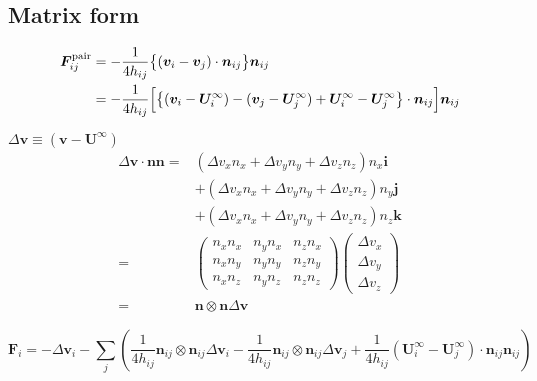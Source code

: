 \documentclass[12pt]{article}
\begin{document}
\newpage
\subsection*{Matrix form}
\begin{align}
 \bm{F}_{ij}^{\mathrm{pair}}
&= 
- \frac{1}{4 h_{ij}}
\bigl\{
(\bm{v}_i-
\bm{v}_j)\cdot
\bm{n}_{ij}
\bigr\}\bm{n}_{ij} \\
&=
- \frac{1}{4 h_{ij}}
\Bigl[
\bigl\{
(\bm{v}_i- \bm{U}^{\infty}_i)-
(\bm{v}_j- \bm{U}^{\infty}_j)
+ \bm{U}^{\infty}_i 
- \bm{U}^{\infty}_j
\bigr\}\cdot
\bm{n}_{ij}
\Bigr]
\bm{n}_{ij}
\end{align}

$\Delta \bm{v} \equiv (\bm{v}- \bm{U}^{\infty})$
\begin{align}
\Delta \bm{v} \cdot
\bm{n} \bm{n}
= &
(\Delta v_x n_x 
+\Delta v_y n_y
+\Delta v_z n_z) n_x \bm{i}\\
& 
+ (\Delta v_x n_x 
+\Delta v_y n_y
+\Delta v_z n_z) n_y \bm{j}\\
&
+ (\Delta v_x n_x 
+\Delta v_y n_y
+\Delta v_z n_z) n_z \bm{k} \\
=&
\begin{pmatrix}
 n_x n_x &   n_y n_x &   n_z n_x \\
 n_x n_y &   n_y n_y &   n_z n_y \\
 n_x n_z &   n_y n_z &   n_z n_z 
\end{pmatrix}
\begin{pmatrix}
 \Delta v_x \\
 \Delta v_y \\
 \Delta v_z 
\end{pmatrix} 
\\
=&\bm{n} \otimes \bm{n} \Delta \bm{v}
\end{align}

\begin{equation}
\bm{F}_i  = 
 -  \Delta \bm{v}_i 
- \sum_j
\left(
 \frac{1}{4h_{ij}} \bm{n}_{ij} \otimes \bm{n}_{ij} \Delta \bm{v}_i
- \frac{1}{4h_{ij}} \bm{n}_{ij} \otimes \bm{n}_{ij} \Delta \bm{v}_j 
 + \frac{1}{4h_{ij}}  
(\bm{U}_i^{\infty} -\bm{U}_j^{\infty} 
) \cdot \bm{n}_{ij}\bm{n}_{ij} 
\right)
\end{equation}
\end{document}
